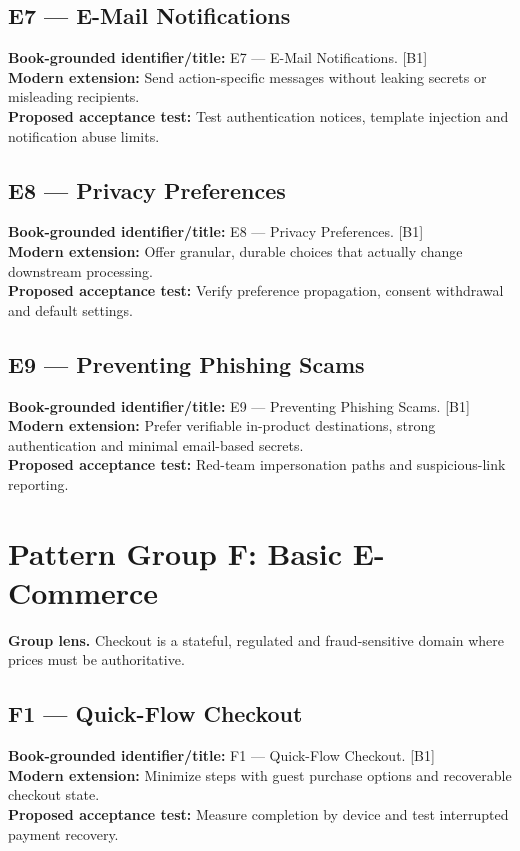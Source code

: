 \documentclass[11pt]{article}
\begin{document}
\subsection{E7 — E-Mail Notifications}
\noindent\textcolor{Ocean}{\textbf{Book-grounded identifier/title:}} E7 — E-Mail Notifications. [B1]\\
\textcolor{Mint}{\textbf{Modern extension:}} Send action-specific messages without leaking secrets or misleading recipients.\\
\textcolor{Amber}{\textbf{Proposed acceptance test:}} Test authentication notices, template injection and notification abuse limits.\medskip
\subsection{E8 — Privacy Preferences}
\noindent\textcolor{Ocean}{\textbf{Book-grounded identifier/title:}} E8 — Privacy Preferences. [B1]\\
\textcolor{Mint}{\textbf{Modern extension:}} Offer granular, durable choices that actually change downstream processing.\\
\textcolor{Amber}{\textbf{Proposed acceptance test:}} Verify preference propagation, consent withdrawal and default settings.\medskip
\subsection{E9 — Preventing Phishing Scams}
\noindent\textcolor{Ocean}{\textbf{Book-grounded identifier/title:}} E9 — Preventing Phishing Scams. [B1]\\
\textcolor{Mint}{\textbf{Modern extension:}} Prefer verifiable in-product destinations, strong authentication and minimal email-based secrets.\\
\textcolor{Amber}{\textbf{Proposed acceptance test:}} Red-team impersonation paths and suspicious-link reporting.\medskip
\section{Pattern Group F: Basic E-Commerce}

\begin{notebox}\textbf{Group lens.} Checkout is a stateful, regulated and fraud-sensitive domain where prices must be authoritative.\end{notebox}
\subsection{F1 — Quick-Flow Checkout}
\noindent\textcolor{Ocean}{\textbf{Book-grounded identifier/title:}} F1 — Quick-Flow Checkout. [B1]\\
\textcolor{Mint}{\textbf{Modern extension:}} Minimize steps with guest purchase options and recoverable checkout state.\\
\textcolor{Amber}{\textbf{Proposed acceptance test:}} Measure completion by device and test interrupted payment recovery.\medskip
\end{document}
